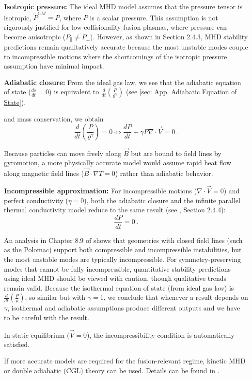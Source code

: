 \begin{enumerate}
    \textbf{Isotropic pressure:} The ideal MHD model assumes that the pressure tensor is isotropic, 
    $\overleftrightarrow{P}^{CM} = P$, where $P$ is a scalar pressure. This assumption 
    is not rigorously justified for low-collisionality fusion plasmas, where pressure can become 
    anisotropic ($P_\parallel \neq P_\perp$). However, as shown in \cite{Freidberg2014} Section 2.4.3, 
    MHD stability predictions remain qualitatively accurate because the most unstable modes couple 
    to incompressible motions where the shortcomings of the isotropic pressure assumption have 
    minimal impact.

    \textbf{Adiabatic closure:}
    From the ideal gas law, we see that the adiabatic equation of state ($\frac{ds}{dt}=0$) is equivalent
     to $\frac{d}{dt}(\frac{P}{\varrho^\gamma})$ (see \autoref{sec: App. Adiabatic Equation of State}).
    
    and mass conservation, we obtain
    \[
        \frac{d}{dt}\left(\frac{P}{\varrho^\gamma}\right) = 0 \iff \frac{dP}{dt} + \gamma P \nabla \cdot \vec{V} = 0  \, .
    \]
    
    Because particles can move freely along $\vec{B}$ but are bound to field lines by gyromotion, 
    a more physically accurate model would assume rapid heat flow along magnetic field lines 
    ($\vec{B}\cdot\nabla T = 0$) rather than adiabatic behavior.

    \textbf{Incompressible approximation:} For incompressible motions ($\nabla \cdot \vec{V} = 0$) 
    and perfect conductivity ($\eta = 0$), both the adiabatic closure and the infinite parallel 
    thermal conductivity model reduce to the same result (see \cite{Freidberg2014}, Section 2.4.4):
    \[
    \frac{dP}{dt} = 0  \, .
    \]

    An analysis in Chapter 8.9 of \cite{Freidberg2014} shows that geometries with closed field lines 
    (such as the Polomac) support both compressible and incompressible instabilities, but the most 
    unstable modes are typically incompressible. For symmetry-preserving modes that cannot be fully 
    incompressible, quantitative stability predictions using ideal MHD should be viewed with caution, 
    though qualitative trends remain valid.
    Because the isothermal equation of state (from ideal gas law) is $\frac{d}{dt}(\frac{P}{\varrho})$,
    so similar but with $\gamma=1$, we conclude that whenever a result depends on $\gamma$, isothermal
    and adiabatic assumptions produce different outputs and we have to be careful with the result.


    In static equilibrium ($\vec{V} = 0$), the incompressibility condition is automatically satisfied.

    If more accurate models are required for the fusion-relevant regime, kinetic MHD or double 
    adiabatic (CGL) theory can be used. Details can be found in \cite{Freidberg2014}.





\end{enumerate}




